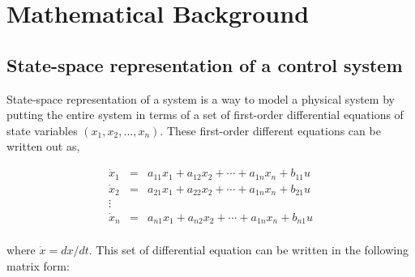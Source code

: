 \chapter{Mathematical Background}\label{chap:math}

\section{State-space representation of a control system}

State-space representation of a system is a way to model a
physical system by putting the entire system in terms of a set of
first-order differential equations of state variables
$(x_{1},x_{2},\ldots,x_{n})$.  These first-order different
equations can be written out as,

\begin{eqnarray*}
\dot {x}_{1}&=&a_{11}x_{1}+a_{12}x_{2}+\cdots+a_{1n}x_{n}+b_{11}u\\
\dot {x}_{2}&=&a_{21}x_{1}+a_{22}x_{2}+\cdots+a_{1n}x_{n}+b_{21}u\\
\vdots&\\
\dot {x}_{n}&=&a_{n1}x_{1}+a_{n2}x_{2}+\cdots+a_{1n}x_{n}+b_{n1}u\\
\end{eqnarray*}

\noindent where $\dot x=dx/dt$.  This set of differential equation
can be written in the following matrix form:

